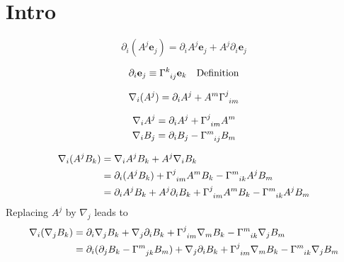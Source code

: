 \documentclass[11pt]{article}
\newcommand{\vect}[1]{\mathbf{#1}}
\begin{document}
\section{Intro}

\begin{equation}
    \partial_i (A^j \vect{e}_j) = \partial_i A^j \vect{e}_j + A^j \partial_i \vect{e}_j
\end{equation}

\begin{equation}
    \partial_i \vect{e}_j \equiv \tensor{\Gamma}{^k_{ij}} \vect{e}_k \quad \text{Definition}
\end{equation}

\begin{equation}
    \nabla_i(A^j) = \partial_i A^j + A^m \tensor{\Gamma}{^j_{im}}
\end{equation}

\begin{subequations}
    \begin{align}
        \nabla_i A^j = \partial_i A^j + \tensor{\Gamma}{^j_{im}} A^m \\
        \nabla_i B_j = \partial_i B_j - \tensor{\Gamma}{^m_{ij}} B_m 
    \end{align}
\end{subequations}

\begin{subequations}
    \begin{align}
        \nabla_i(A^j B_k) 
        &= \nabla_i A^j B_k + A^j \nabla_i B_k \\
        &= \partial_i(A^j B_k) + \tensor{\Gamma}{^j_{im}} A^m B_k - \tensor{\Gamma}{^m_{ik}} A^j B_m \\
        &= \partial_i A^j B_k + A^j \partial_i B_k + \tensor{\Gamma}{^j_{im}} A^m B_k - \tensor{\Gamma}{^m_{ik}} A^j B_m \\
    \end{align}
\end{subequations}
Replacing $A^j$ by $\nabla_j$ leads to
\begin{subequations}
    \begin{align}
        \nabla_i(\nabla_j B_k) 
        &= \partial_i \nabla_j B_k + \nabla_j \partial_i B_k + \tensor{\Gamma}{^j_{im}} \nabla_m B_k - \tensor{\Gamma}{^m_{ik}} \nabla_j B_m \\
        &= \partial_i (\partial_j B_k - \tensor{\Gamma}{^m_{jk}}  B_m) + \nabla_j \partial_i B_k + \tensor{\Gamma}{^j_{im}} \nabla_m B_k - \tensor{\Gamma}{^m_{ik}} \nabla_j B_m \\
    \end{align}
\end{subequations}
\end{document}
